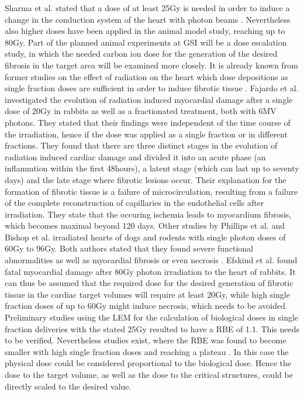 Sharma et al. stated that a dose of at least 25Gy is needed in order to induce a change in the conduction system of the heart with photon 
beams \cite{Sha10}. Nevertheless also higher doses have been applied in the animal model study, reaching up to 80Gy. 
Part of the planned animal experiments at GSI will be a dose escalation study, in which the needed carbon ion dose for the 
generation of the desired fibrosis in the target area will be examined more closely. 
It is already known from former studies on the effect of radiation on the heart which dose depositions as single fraction doses are sufficient 
in order to induce fibrotic tissue \cite{Faj70, Faj73, Phil64, Bis65, Ste68, Efs56}.\newline
\newline
Fajardo et al. \cite{Faj70, Faj73} investigated the evolution of radiation induced myocardial damage after a single dose 
of 20Gy in rabbits as well as a fractionated treatment, both with 6MV photons. They stated that their findings were independent of the 
time course of the irradiation, hence if the dose was applied as a single fraction or in different fractions. They found that there are three 
distinct stages in the evolution of radiation induced cardiac damage and divided it into an acute phase (an inflammtion within the first 
48hours), a latent stage (which can last up to seventy days) and the late stage where fibrotic lesions occur. Their explanation for the formation of fibrotic 
tissue is a failure of microcirculation, resulting from a failure of the complete reconstruction of capillaries in the endothelial cells after 
irradiation. They state that the occuring ischemia leads to myocardium fibrosis, which becomes maximal beyond 120 days.
Other studies by Phillips et al. \cite{Phil64} and Bishop et al. \cite{Bis65} irradiated hearts of dogs and rodents with single photon doses 
of 60Gy to 96Gy. Both authors stated that they found severe functional abnormalities as well as myocardial 
fibrosis or even necrosis \cite{Ste68}. Efskind et al. \cite{Efs56} found fatal myocardial damage after 80Gy photon irradiation to the heart 
of rabbits.\newline
\newline
It can thus be assumed that the required dose for the desired generation of fibrotic tissue in the cardiac target volumes 
will require at least 20Gy, while high single fraction doses of up to 60Gy might induce necrosis, which needs to be avoided.
Preliminary studies using the LEM for the calculation of biological doses in single fraction deliveries with the stated 25Gy resulted to have 
a RBE of 1.1. This needs to be verified. Nevertheless studies exist, where the RBE was found to become smaller with high single 
fraction doses and reaching a plateau \cite{Cara07}. In this case the physical dose could be considered proportional to the biological 
dose. Hence the dose to the target volume, as well as the dose to the critical structures, could be directly scaled to the desired value. 


